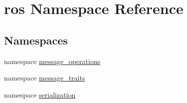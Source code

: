 \hypertarget{namespaceros}{
\section{ros Namespace Reference}
\label{namespaceros}
}
\subsection*{Namespaces}
\begin{DoxyCompactItemize}
\item 
namespace \hyperlink{namespaceros_1_1message__operations}{message\_\-operations}
\item 
namespace \hyperlink{namespaceros_1_1message__traits}{message\_\-traits}
\item 
namespace \hyperlink{namespaceros_1_1serialization}{serialization}
\end{DoxyCompactItemize}
